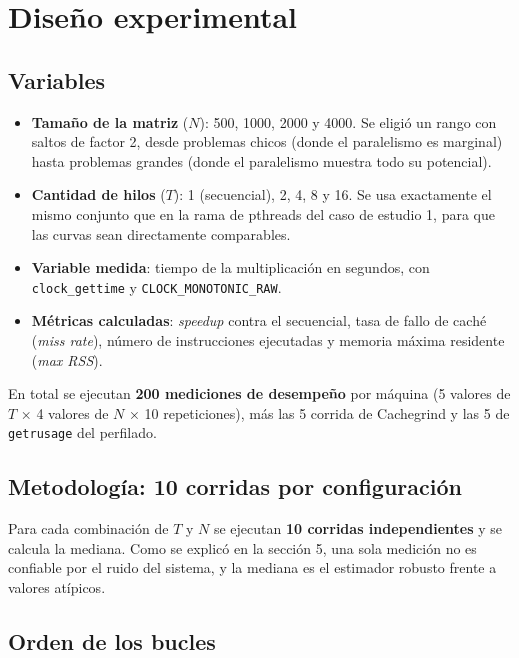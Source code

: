 \section{Diseño experimental}

\subsection{Variables}

\begin{itemize}
    \item \textbf{Tamaño de la matriz} ($N$): 500, 1000, 2000 y 4000. Se eligió un rango con saltos de factor 2, desde problemas chicos (donde el paralelismo es marginal) hasta problemas grandes (donde el paralelismo muestra todo su potencial).
    \item \textbf{Cantidad de hilos} ($T$): 1 (secuencial), 2, 4, 8 y 16. Se usa exactamente el mismo conjunto que en la rama de pthreads del caso de estudio 1, para que las curvas sean directamente comparables.
    \item \textbf{Variable medida}: tiempo de la multiplicación en segundos, con \texttt{clock\_gettime} y \texttt{CLOCK\_MONOTONIC\_RAW}.
    \item \textbf{Métricas calculadas}: \textit{speedup} contra el secuencial, tasa de fallo de caché (\textit{miss rate}), número de instrucciones ejecutadas y memoria máxima residente (\textit{max RSS}).
\end{itemize}

En total se ejecutan \textbf{200 mediciones de desempeño} por máquina (5 valores de $T$ × 4 valores de $N$ × 10 repeticiones), más las 5 corrida de Cachegrind y las 5 de \texttt{getrusage} del perfilado.

\subsection{Metodología: 10 corridas por configuración}

Para cada combinación de $T$ y $N$ se ejecutan \textbf{10 corridas independientes} y se calcula la mediana. Como se explicó en la sección 5, una sola medición no es confiable por el ruido del sistema, y la mediana es el estimador robusto frente a valores atípicos.

\subsection{Orden de los bucles}

